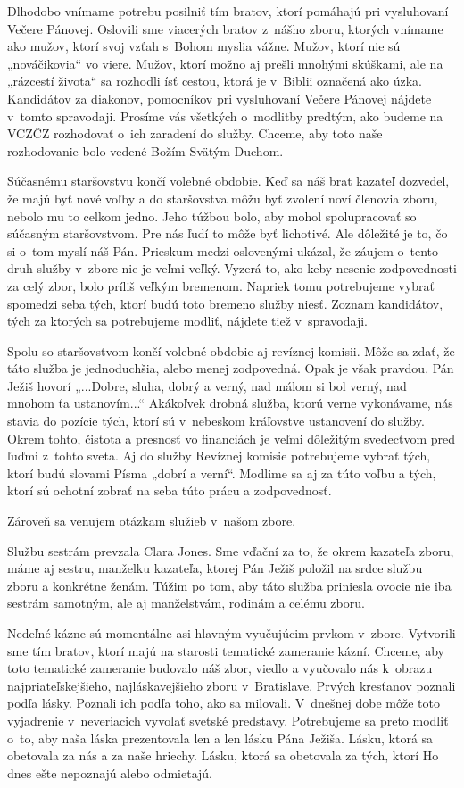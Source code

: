 Dlhodobo vnímame potrebu posilniť tím bratov, ktorí pomáhajú pri vysluhovaní Večere Pánovej. Oslovili sme viacerých bratov z~nášho zboru, ktorých vnímame ako mužov, ktorí svoj vzťah s~Bohom myslia vážne. Mužov, ktorí nie sú „nováčikovia“ vo viere. Mužov, ktorí možno aj prešli mnohými skúškami, ale na „rázcestí života“ sa rozhodli ísť cestou,  ktorá je v~Biblii označená ako úzka. Kandidátov za diakonov, pomocníkov pri vysluhovaní Večere Pánovej nájdete v~tomto spravodaji. Prosíme vás všetkých o~modlitby predtým, ako budeme na VCZČZ rozhodovať o~ich zaradení do služby. Chceme, aby toto naše rozhodovanie bolo vedené Božím Svätým Duchom.

Súčasnému staršovstvu končí volebné obdobie. Keď sa náš brat kazateľ dozvedel, že majú byť nové voľby a do staršovstva môžu byť zvolení noví členovia zboru, nebolo mu to celkom jedno. Jeho túžbou bolo, aby mohol spolupracovať so súčasným staršovstvom. Pre nás ľudí to môže byť lichotivé. Ale dôležité je to, čo si o~tom myslí náš Pán. Prieskum medzi oslovenými ukázal, že  záujem o~tento druh služby v~zbore nie je veľmi veľký. Vyzerá to, ako keby nesenie zodpovednosti za celý zbor, bolo príliš veľkým bremenom. Napriek tomu potrebujeme vybrať spomedzi seba tých, ktorí budú toto bremeno služby niesť. Zoznam kandidátov, tých za ktorých sa potrebujeme modliť, nájdete tiež v~spravodaji.

Spolu so staršovstvom končí volebné obdobie aj revíznej komisii. Môže sa zdať, že táto služba je jednoduchšia, alebo menej zodpovedná. Opak je však pravdou. Pán Ježiš hovorí „...Dobre, sluha, dobrý a verný, nad málom si bol verný, nad mnohom ťa ustanovím...“ Akákoľvek drobná služba, ktorú verne vykonávame, nás stavia do pozície tých, ktorí sú v~nebeskom kráľovstve ustanovení do služby. Okrem tohto, čistota a presnosť vo financiách je veľmi dôležitým svedectvom pred ľuďmi z~tohto sveta. Aj do služby Revíznej komisie potrebujeme vybrať tých, ktorí budú slovami Písma „dobrí a verní“. Modlime sa aj za túto voľbu a tých, ktorí sú ochotní zobrať na seba túto prácu a zodpovednosť.

Zároveň sa venujem otázkam služieb v~našom zbore.

Službu sestrám prevzala Clara Jones. Sme vďační za to, že okrem kazateľa zboru, máme aj sestru, manželku kazateľa, ktorej Pán Ježiš položil na srdce službu zboru a konkrétne ženám. Túžim po tom, aby táto služba priniesla ovocie nie iba sestrám samotným, ale aj manželstvám, rodinám a celému zboru.

Nedeľné kázne sú momentálne asi hlavným vyučujúcim prvkom v~zbore. Vytvorili sme tím bratov, ktorí majú na starosti tematické zameranie kázní. Chceme, aby toto tematické zameranie budovalo náš zbor, viedlo a vyučovalo nás k~obrazu najpriateľskejšieho, najláskavejšieho zboru v~Bratislave. Prvých kresťanov poznali podľa lásky. Poznali ich podľa toho, ako sa milovali. V~dnešnej dobe môže toto vyjadrenie v~neveriacich vyvolať svetské predstavy. Potrebujeme sa preto modliť o~to, aby naša láska prezentovala len a len lásku Pána Ježiša. Lásku, ktorá sa obetovala za nás a za naše hriechy. Lásku, ktorá sa obetovala za tých, ktorí Ho dnes ešte nepoznajú alebo odmietajú.


